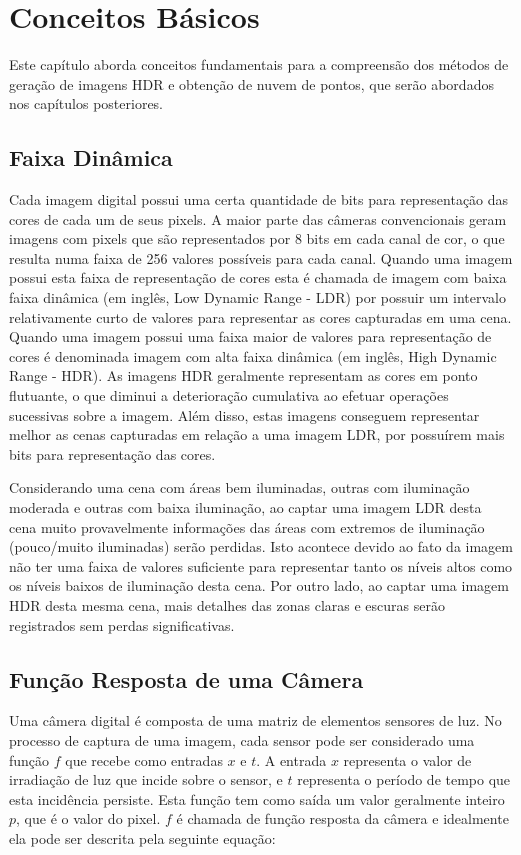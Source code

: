 \chapter{Conceitos Básicos} \label{conceitos}
	Este capítulo aborda conceitos fundamentais para a compreensão dos métodos de geração de imagens HDR e obtenção de nuvem de pontos, que serão abordados nos capítulos posteriores.
	
\section{Faixa Dinâmica} \label{conceitoFaixa}
    Cada imagem digital possui uma certa quantidade de bits para representação das cores de cada um de seus pixels. A maior parte das câmeras convencionais geram imagens com pixels que são representados por 8 bits em cada canal de cor, o que resulta numa faixa de 256 valores possíveis para cada canal. Quando uma imagem possui esta faixa de representação de cores esta é chamada de imagem com baixa faixa dinâmica (em inglês, Low Dynamic Range - LDR) por possuir um intervalo relativamente curto de valores para representar as cores capturadas em uma cena. Quando uma imagem possui uma faixa maior de valores para representação de cores é denominada imagem com alta faixa dinâmica (em inglês, High Dynamic Range - HDR). As imagens HDR geralmente representam as cores em ponto flutuante, o que diminui a deterioração cumulativa ao efetuar operações sucessivas sobre a imagem. Além disso, estas imagens conseguem representar melhor as cenas capturadas em relação a uma imagem LDR, por possuírem mais bits para representação das cores.
    
    Considerando uma cena com áreas bem iluminadas, outras com iluminação moderada e outras com baixa iluminação, ao captar uma imagem LDR desta cena muito provavelmente informações das áreas com extremos de iluminação (pouco/muito iluminadas) serão perdidas. Isto acontece devido ao fato da imagem não ter uma faixa de valores suficiente para representar tanto os níveis altos como os níveis baixos de iluminação desta cena. Por outro lado, ao captar uma imagem HDR desta mesma cena, mais detalhes das zonas claras e escuras serão registrados sem perdas significativas.
	
\section{Função Resposta de uma Câmera} \label{conceitoFR}
	Uma câmera digital é composta de uma matriz de elementos sensores de luz. No processo de captura de uma imagem, cada sensor pode ser considerado uma função $f$ que recebe como entradas $x$ e $t$. A entrada $x$ representa o valor de irradiação de luz que incide sobre o sensor, e $t$ representa o período de tempo que esta incidência persiste. Esta função tem como saída um valor geralmente inteiro $p$, que é o valor do pixel. $f$ é chamada de função resposta da câmera e idealmente ela pode ser descrita pela seguinte equação:
	
